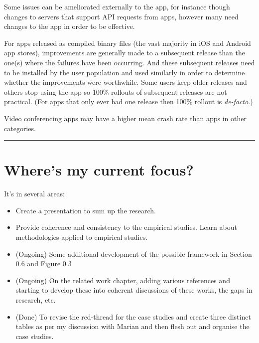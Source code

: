 Some issues can be ameliorated externally to the app, for instance though changes to servers that support API requests from apps, however many need changes to the app in order to be effective.

For apps released as compiled binary files (the vast majority in iOS and Android app stores), improvements are generally made to a subsequent release than the one(s) where the failures have been occurring\footnotemark. And these subsequent releases need to be installed by the user population and used similarly in order to determine whether the improvements were worthwhile. Some users keep older releases and others stop using the app so 100\% rollouts of subsequent releases are not practical. (For apps that only ever had one release then 100\% rollout is \emph{de-facto}.)




Video conferencing apps may have a higher mean crash rate than apps in other categories. 

\noindent
\rule{\textwidth}{0.4pt}

\clearpage
\section{Where's my current focus?}
It's in several areas:
\begin{itemize}
    \item Create a presentation to sum up the research.
    \item Provide coherence and consistency to the empirical studies. Learn about methodologies applied to empirical studies.
    \item (Ongoing) Some additional development of the possible framework in Section 0.6 and Figure 0.3
    \item (Ongoing) On the related work chapter, adding various references and starting to develop these into coherent discussions of these works, the gaps in research, etc.
    \item (Done) To revise the red-thread for the case studies and create three distinct tables as per my discussion with Marian and then flesh out and organise the case studies.
\end{itemize}

